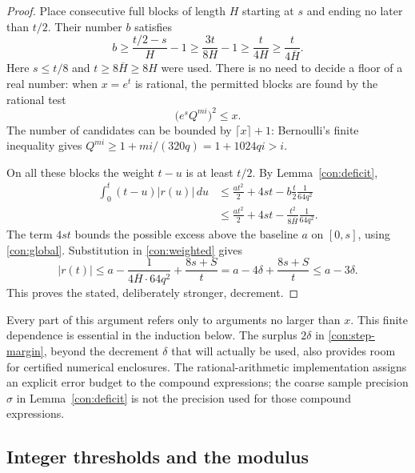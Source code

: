 \begin{proof}
Place consecutive full blocks of length $H$ starting at $s$ and ending
no later than $t/2$.  Their number $b$ satisfies
\[
 b\geq \frac{t/2-s}{H}-1
   \geq\frac{3t}{8H}-1
   \geq\frac{t}{4H}
   \geq\frac{t}{4\overline H}.
\]
Here $s\leq t/8$ and $t\geq8\overline H\geq8H$ were used.
There is no need to decide a floor of a real number: when $x=e^t$ is
rational, the permitted blocks are found by the rational test
\[
 \bigl(e^s Q^{m i}\bigr)^2\leq x.
\]
The number of candidates can be bounded by $\lceil x\rceil+1$:
Bernoulli's finite inequality gives
$Q^{mi}\geq1+mi/(320q)=1+1024qi>i$.

On all these blocks the weight $t-u$ is at least $t/2$.
By Lemma~\ref{con:deficit},
\begin{align*}
 \int_0^t(t-u)|r(u)|\,du
 &\leq\frac{at^2}{2}+4st
      -b\frac{t}{2}\frac1{64q^2}\\
 &\leq\frac{at^2}{2}+4st
      -\frac{t^2}{8\overline H}\frac1{64q^2}.
\end{align*}
The term $4st$ bounds the possible excess above the baseline $a$
on $[0,s]$, using \eqref{con:global}.
Substitution in \eqref{con:weighted} gives
\[
 |r(t)|\leq a
    -\frac1{4\overline H\cdot64q^2}
    +\frac{8s+S}{t}
 =a-4\delta+\frac{8s+S}{t}
 \leq a-3\delta.
\]
This proves the stated, deliberately stronger, decrement.
\end{proof}

Every part of this argument refers only to arguments no larger than $x$.
This finite dependence is essential in the induction below.  The surplus
$2\delta$ in \eqref{con:step-margin}, beyond the decrement $\delta$
that will actually be used, also provides room for certified numerical
enclosures.  The rational-arithmetic implementation assigns an explicit
error budget to the compound expressions; the coarse sample precision
$\sigma$ in Lemma~\ref{con:deficit} is not the precision used for those
compound expressions.

\subsection{Integer thresholds and the modulus}

